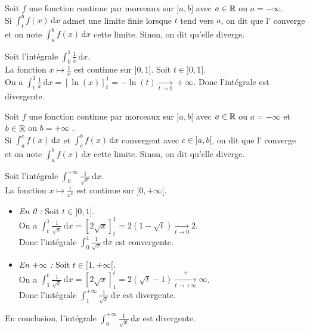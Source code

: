 \documentclass{book}
\begin{document}
\begin{Definition}[Intégrale impropre sur {$]a,b]$}]
Soit $f$ une fonction continue par morceaux  sur $]a,b]$ avec $a \in \mathbb{R}$ ou $a= -\infty$.\\
Si $\int_t^b f(x) \,\mathrm dx$ admet une limite finie lorsque $t$ tend vers $a$, on dit que l' converge et on
note $\int_a^b f(x) \,\mathrm dx$ cette limite. Sinon, on dit qu'elle diverge.
\end{Definition}
\begin{Exemple}
Soit l'intégrale $\int_0^{1} \frac{1}{x}\,\mathrm dx$.\\
La fonction $ x\mapsto  \frac{1}{x}$ est continue sur $]0,1]$.  Soit $t\in ]0,1]$.\\
On a  $\int_t^1 \frac{1}{x}\,\mathrm dx=[\ln (x)]_t^1=-\ln(t)\xrightarrow[t\to 0 ]{}+\infty$. Donc l'intégrale est divergente.
\end{Exemple}
\begin{Definition}
Soit $f$ une fonction continue par morceaux  sur $]a,b[$ avec $a \in \mathbb{R}$ ou $a= -\infty$ et $b \in \mathbb{R}$ ou $b= +\infty$ .\\
Si $\int_a^c f(x) \,\mathrm dx$ et $\int_c^b f(x) \,\mathrm dx$  convergent avec $c\in ]a,b[$, on dit que l' converge et on
note $\int_a^b f(x) \,\mathrm dx$ cette limite. Sinon, on dit qu'elle diverge.
\end{Definition}
\begin{Exemple}
Soit l'intégrale $\int_0^{+\infty } \frac{1}{\sqrt{x}}\,\mathrm dx$.\\
La fonction $ x\mapsto  \frac{1}{x^2}$ est continue sur $]0,+\infty[$. \\
\begin{itemize}
\item \textit{En 0 :}   Soit $t\in ]0,1]$.\\
On a  $\int_t^1 \frac{1}{\sqrt{x}}\,\mathrm dx=[2 \sqrt{x}]_t^1=2(1-\sqrt{t})\xrightarrow[t\to 0 ]{}2$.\\Donc l'intégrale $\int_0^1  \frac{1}{\sqrt{x}}\,\mathrm dx$  est convergente.
\item \textit{En $+\infty$ :} Soit $t\in [1,{+\infty }[$.\\
On a  $\int_1^t \frac{1}{\sqrt{x}}\,\mathrm dx=[2 \sqrt{x}]_1^t=2(\sqrt{t}-1)\xrightarrow[t\to +\infty ]+\infty $.\\Donc l'intégrale $\int_1^{+\infty } \frac{1}{\sqrt{x}}\,\mathrm dx$ est divergente.
\end{itemize}
En conclusion,  l'intégrale $\int_0^{+\infty } \frac{1}{\sqrt{x}}\,\mathrm dx$ est divergente.
\end{Exemple}
\end{document}

